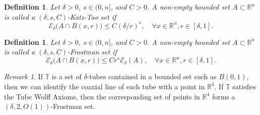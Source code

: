 \documentclass[letterpaper, reqno,11pt]{article}
\numberwithin{equation}{section}
\newcommand{\RR}{\mathbb{R}}
\newcommand{\tubes}{\mathbb{T}}
\numberwithin{thm}{section}
\newtheorem{defn}[thm]{Definition}
\theoremstyle{remark}
\newtheorem{rem}[thm]{Remark}
\begin{document}
\begin{defn}
        Let $\delta>0$, $s\in (0, n]$, and $C>0$. A non-empty bounded set $A\subset \mathbb{R}^n$ is called a $(\delta, s, C)$-Katz-Tao set if 
    \[
    \mathcal{E}_{\delta}\big(A\cap B(x,r)\big)\leq C(\delta/r)^s, \quad \forall x\in \mathbb{R}^n, r\in [\delta, 1].
    \]
\end{defn}


\begin{defn}
    Let $\delta>0$, $s\in (0, n]$, and $C>0$. A non-empty bounded set $A\subset \mathbb{R}^n$ is called a $(\delta, s,C)$-Frostman set if 
    \[
    \mathcal{E}_\delta\big(A\cap B(x,r)\big)\leq C r^s \mathcal{E}_{\delta}(A), \quad \forall x\in \mathbb{R}^n, r\in [\delta, 1].
    \]
\end{defn}

\begin{rem}\label{tubeWolffVsFrostmanSet}
If $\tubes$ is a set of $\delta$-tubes contained in a bounded set such as $B(0,1)$, then we can identify the coaxial line of each tube with a point in $\RR^4$. If $\tubes$ satisfies the Tube Wolff Axioms, then the corresponding set of points in $\RR^4$ forms a $(\delta, 2, O(1))$-Frostman set.%
\end{rem}
\end{document}
